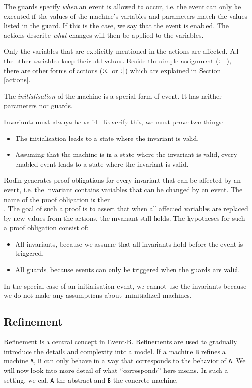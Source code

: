 The guards specify \emph{when} an event is allowed to occur, i.e. the event can only be executed if the values of the machine's variables and parameters match the values listed in the guard. If this is the case, we say that the event is enabled.
The actions describe \emph{what} changes will then be applied to the variables.

Only the variables that are explicitly mentioned in the actions are affected.
All the other variables keep their old values. Beside the simple assignment ($\mathrel{:\mkern1mu=}$),
there are other forms of actions ($\mathrel{:\mkern1mu\in}$ or $\mathrel{:\mkern1mu\mid}$) which are explained in
Section \ref{actions}.

The \emph{initialisation} of the machine is a special form of event. It has neither parameters
nor guards.

Invariants must always be valid. To verify this, we must prove two things:
\begin{itemize}
  \item The initialisation leads to a state where the invariant is valid.
  \item Assuming that the machine is in a state where the invariant is valid,
    every enabled event leads to a state where the invariant is valid.
\end{itemize}

Rodin generates proof obligations for every invariant that can be affected by an event, i.e. the invariant contains variables that can be changed by an event.
The name of the proof obligation is then \\ .
The goal of such a proof is to assert that when all affected variables are replaced by new values from the actions, the invariant still holds. The hypotheses for such a proof obligation consist of:

\begin{itemize}

\item All invariants, because we assume that all invariants hold before the event is triggered,
\item All guards, because events can only be triggered when the guards are valid.
\end{itemize}

In the special case of an initialisation event, we cannot use the invariants because we do not make any assumptions about uninitialized machines.

\subsection{Refinement}
\label{tut_refinement}
Refinement is a central concept in Event-B. Refinements are used to gradually
introduce the details and complexity into a model.
If a machine \texttt{B} refines a machine \texttt{A}, \texttt{B} can only behave in a way that
corresponds to the behavior of \texttt{A}. We will now look into more detail of what ``corresponds''
here means.
In such a setting, we call \texttt{A} the abstract and \texttt{B} the concrete machine.

